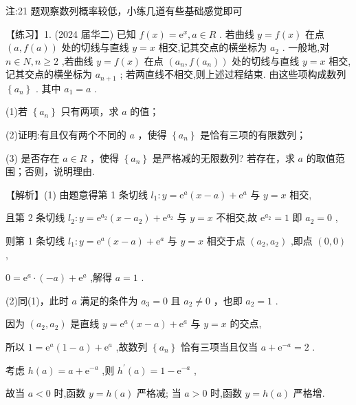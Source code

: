 \documentclass[10pt]{article}
\begin{document}
注:21 题观察数列概率较低，小练几道有些基础感觉即可

【练习】1. (2024 届华二) 已知 \(f\left( x\right)  = {\mathrm{e}}^{x},a \in  R\) . 若曲线 \(y = f\left( x\right)\) 在点 \(\left( {a,f\left( a\right) }\right)\) 处的切线与直线 \(y = x\) 相交,记其交点的横坐标为 \({a}_{2}\) . 一般地,对 \(n \in  N,n \geq  2\) ,若曲线 \(y = f\left( x\right)\) 在点 \(\left( {{a}_{n},f\left( {a}_{n}\right) }\right)\) 处的切线与直线 \(y = x\) 相交,记其交点的横坐标为 \({a}_{n + 1}\) ; 若两直线不相交,则上述过程结束. 由这些项构成数列 \(\left\{  {a}_{n}\right\}\) . 其中 \({a}_{1} = a\) .

(1)若 \(\left\{  {a}_{n}\right\}\) 只有两项，求 \(a\) 的值；

(2)证明:有且仅有两个不同的 \(a\) ，使得 \(\left\{  {a}_{n}\right\}\) 是恰有三项的有限数列；

(3) 是否存在 \(a \in  R\) ，使得 \(\left\{  {a}_{n}\right\}\) 是严格减的无限数列? 若存在，求 \(a\) 的取值范围；否则，说明理由.

【解析】(1) 由题意得第 1 条切线 \({l}_{1} : y = {\mathrm{e}}^{a}\left( {x - a}\right)  + {\mathrm{e}}^{a}\) 与 \(y = x\) 相交,

且第 2 条切线 \({l}_{2} : y = {\mathrm{e}}^{{a}_{2}}\left( {x - {a}_{2}}\right)  + {\mathrm{e}}^{{a}_{2}}\) 与 \(y = x\) 不相交,故 \({\mathrm{e}}^{{a}_{2}} = 1\) 即 \({a}_{2} = 0\) ,

则第 1 条切线 \({l}_{1} : y = {\mathrm{e}}^{a}\left( {x - a}\right)  + {\mathrm{e}}^{a}\) 与 \(y = x\) 相交于点 \(\left( {{a}_{2},{a}_{2}}\right)\) ,即点 \(\left( {0,0}\right)\) ,

\(0 = {\mathrm{e}}^{a} \cdot  \left( {-a}\right)  + {\mathrm{e}}^{a}\) ,解得 \(a = 1\) .

(2)同(1)，此时 \(a\) 满足的条件为 \({a}_{3} = 0\) 且 \({a}_{2} \neq  0\) ，也即 \({a}_{2} = 1\) .

因为 \(\left( {{a}_{2},{a}_{2}}\right)\) 是直线 \(y = {\mathrm{e}}^{a}\left( {x - a}\right)  + {\mathrm{e}}^{a}\) 与 \(y = x\) 的交点,

所以 \(1 = {\mathrm{e}}^{a}\left( {1 - a}\right)  + {\mathrm{e}}^{a}\) ,故数列 \(\left\{  {a}_{n}\right\}\) 恰有三项当且仅当 \(a + {\mathrm{e}}^{-a} = 2\) .

考虑 \(h\left( a\right)  = a + {\mathrm{e}}^{-a}\) ,则 \({h}^{\prime }\left( a\right)  = 1 - {\mathrm{e}}^{-a}\) ,

故当 \(a < 0\) 时,函数 \(y = h\left( a\right)\) 严格减; 当 \(a > 0\) 时,函数 \(y = h\left( a\right)\) 严格增.
\end{document}
